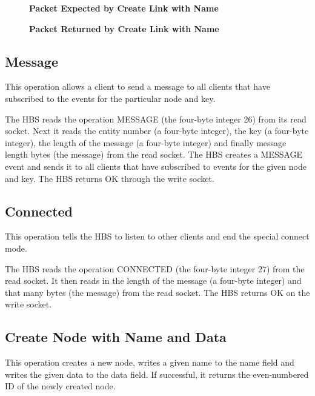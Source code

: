 \begin{figure}[htb]
  \centerline{}
  \caption{{\bf Packet Expected by Create Link with Name}}
  \label{fig:completelink1}
\end{figure}


\begin{figure}[htb]
  \centerline{}
  \caption{{\bf Packet Returned by Create Link with Name}}
  \label{fig:completelink2}
\end{figure}

\subsection{Message}

This operation allows a client to send a message to all clients that have
subscribed to the events for the particular node and key.

The HBS reads the operation MESSAGE (the four-byte integer 26) from its
read socket.  Next it reads the entity number (a four-byte integer), the
key (a four-byte integer), the length of the message (a four-byte integer)
and finally message length bytes (the message) from the read socket.  The
HBS creates a MESSAGE event and sends it to all clients that have
subscribed to events for the given node and key. The HBS returns OK through
the write socket.

\subsection{Connected}

This operation tells the HBS to listen to other clients and end the special
connect mode.

The HBS reads the operation CONNECTED (the four-byte integer 27) from the
read socket.  It then reads in the length of the message (a four-byte
integer) and that many bytes (the message) from the read socket.  The HBS
returns OK on the write socket.

\subsection{Create Node with Name and Data}

This operation creates a new node, writes a given name to the name field
and writes the given data to the data field.  If successful, it returns the
even-numbered ID of the newly created node.

